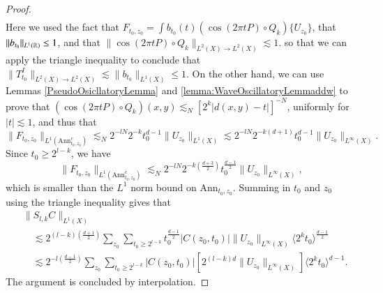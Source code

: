 \begin{proof}
\begin{align*}
    \end{align*}
    Here we used the fact that $F_{t_0,z_0} = \int b_{t_0}(t) ( \cos(2 \pi t P) \circ Q_k ) \{ U_{z_0} \}$, that $\| b_{t_0} \|_{L^1(\operatorname{\mathbb{R}})} \leq 1$,  and that $\| \cos(2 \pi t P) \circ Q_k \|_{L^2(X) \to L^2(X)} \lesssim 1$. so that we can apply the triangle inequality to conclude that $\| T_{t_0}^I \|_{L^2(X) \to L^2(X)} \lesssim \| b_{t_0} \|_{L^1(X)} \leq 1$. On the other hand, we can use Lemmas \ref{PseudoOsicllatoryLemma} and \ref{lemma:WaveOscillatoryLemmaddw} to prove that $(\cos(2 \pi t P) \circ Q_k)(x,y) \lesssim_N [2^k |d(x,y) - t|]^{-N}$, uniformly for $|t| \lesssim 1$, and thus that
    \[ \| F_{t_0,z_0} \|_{L^1(\text{Ann}_{t_0,z_0}^c)} \lesssim_N 2^{-lN} 2^{-k} t_0^{d-1} \| U_{z_0} \|_{L^1(X)} \lesssim 2^{-lN} 2^{-k(d+1)} t_0^{d-1} \| U_{z_0} \|_{L^\infty(X)}. \]
    Since $t_0 \geq 2^{l-k}$, we have
    \[ \| F_{t_0,z_0} \|_{L^1(\text{Ann}_{t_0,z_0}^c)} \lesssim_N 2^{-lN} 2^{-k \left( \frac{d+3}{2} \right)} t_0^{\frac{d-1}{2}} \| U_{z_0} \|_{L^\infty(X)}, \]
    which is smaller than the $L^1$ norm bound on $\text{Ann}_{t_0,z_0}$.
    Summing in $t_0$ and $z_0$ using the triangle inequality gives that
    \begin{align*}
        &\| S_{l,k} C \|_{L^1(X)}\\
        &\quad \lesssim 2^{(l-k) \left( \frac{d+1}{2}\right)} \sum\nolimits_{z_0} \sum\nolimits_{t_0 \geq 2^{l-k}} t_0^{\frac{d-1}{2}} |C(z_0,t_0)| \| U_{z_0} \|_{L^\infty(X)} \langle 2^k t_0 \rangle^{\frac{d-1}{2}}\\
        &\quad \lesssim 2^{-l \left( \frac{d-1}{2} \right)} \sum\nolimits_{z_0} \sum\nolimits_{t_0 \geq 2^{l-k}} |C(z_0,t_0)| \left[  2^{(l-k)d} \| U_{z_0} \|_{L^\infty(X)}\right] \langle 2^k t_0 \rangle^{d-1}.
    \end{align*}
    The argument is concluded by interpolation.
\end{proof}

